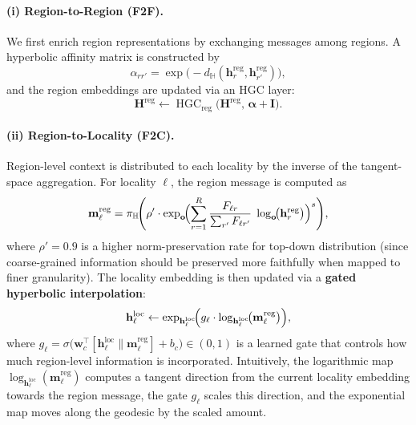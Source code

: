 \paragraph{(i) Region-to-Region (F2F).}
We first enrich region representations by exchanging messages among regions.
A hyperbolic affinity matrix is constructed by
\begin{equation}\label{eq:region_affinity}
  \alpha_{r r'} = \exp\!\bigl(-d_{\mathbb{H}}(\mathbf{h}_r^{\text{reg}}, \mathbf{h}_{r'}^{\text{reg}})\bigr),
\end{equation}
and the region embeddings are updated via an HGC layer:
\begin{equation}\label{eq:f2f}
  \mathbf{H}^{\text{reg}} \leftarrow \operatorname{HGC}_{\text{reg}}\!\bigl(\mathbf{H}^{\text{reg}},\, \boldsymbol{\alpha} + \mathbf{I}\bigr).
\end{equation}

\paragraph{(ii) Region-to-Locality (F2C).}
Region-level context is distributed to each locality by the inverse of the tangent-space aggregation.
For locality $\ell$, the region message is computed as
\begin{equation}\label{eq:f2c}
  \mathbf{m}_\ell^{\text{reg}}
  = \pi_{\mathbb{H}}\!\Biggl(
      \rho' \cdot \exp_{\mathbf{o}}\!\Bigl(
        \sum_{r=1}^{R} \frac{F_{\ell r}}{\sum_{r'} F_{\ell r'}}\;
        \log_{\mathbf{o}}\!\bigl(\mathbf{h}_r^{\text{reg}}\bigr)
      \Bigr)^s
    \Biggr),
\end{equation}
where $\rho' = 0.9$ is a higher norm-preservation rate for top-down distribution (since coarse-grained information should be preserved more faithfully when mapped to finer granularity).
The locality embedding is then updated via a \textbf{gated hyperbolic interpolation}:
\begin{equation}\label{eq:gate_loc}
  \mathbf{h}_\ell^{\text{loc}}
  \leftarrow \exp_{\mathbf{h}_\ell^{\text{loc}}}\!\Bigl(
    g_\ell \cdot \log_{\mathbf{h}_\ell^{\text{loc}}}\!\bigl(\mathbf{m}_\ell^{\text{reg}}\bigr)
  \Bigr),
\end{equation}
where $g_\ell = \sigma\!\bigl(\mathbf{w}_c^\top [\mathbf{h}_\ell^{\text{loc}} \| \mathbf{m}_\ell^{\text{reg}}] + b_c\bigr) \in (0,1)$ is a learned gate
that controls how much region-level information is incorporated.
Intuitively, the logarithmic map $\log_{\mathbf{h}_\ell^{\text{loc}}}(\mathbf{m}_\ell^{\text{reg}})$ computes a tangent direction from the current locality embedding towards the region message,
the gate $g_\ell$ scales this direction,
and the exponential map moves along the geodesic by the scaled amount.

